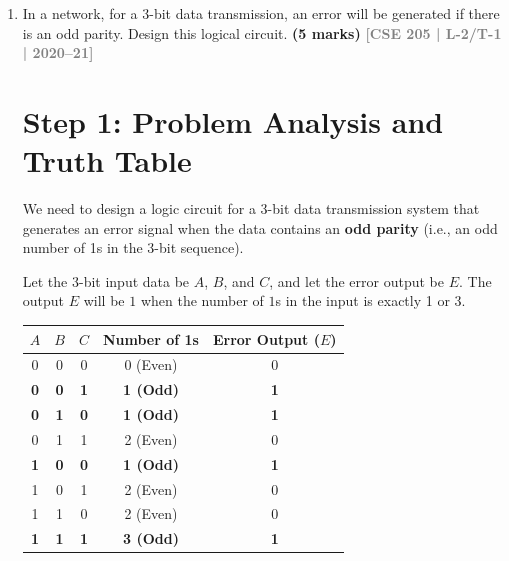 \documentclass[12pt,a3paper]{article}
\newcommand{\yr}[1]{\hfill\textcolor{gray}{\small\textbf{[#1]}}}
\newcommand{\mk}[1]{\textcolor{orange!70!black}{\small\textbf{(#1 marks)}}}
\begin{document}
\begin{enumerate}


\item In a network, for a 3-bit data transmission, an error will be generated if there is an odd parity. Design this logical circuit.
\mk{5} \yr{CSE 205 | L-2/T-1 | 2020--21}

\begin{tcolorbox}[enhanced,breakable,ansbox,colback=cA!4,colframe=cA,boxrule=0.8pt,arc=5pt,title={\textbf{Answer}},fonttitle=\bfseries\color{white},colbacktitle=cA]

\section*{Step 1: Problem Analysis and Truth Table}

We need to design a logic circuit for a 3-bit data transmission system that generates an error signal when the data contains an \textbf{odd parity} (i.e., an odd number of 1s in the 3-bit sequence). 

Let the 3-bit input data be $A$, $B$, and $C$, and let the error output be $E$. The output $E$ will be $1$ when the number of $1$s in the input is exactly 1 or 3.

\begin{center}
\renewcommand{\arraystretch}{1.2}
\begin{tabular}{ccc|c|c}
    \toprule
    \textbf{$A$} & \textbf{$B$} & \textbf{$C$} & \textbf{Number of 1s} & \textbf{Error Output ($E$)} \\
    \midrule
    0 & 0 & 0 & 0 (Even) & 0 \\
    \textcolor{cA}{\textbf{0}} & \textcolor{cA}{\textbf{0}} & \textcolor{cA}{\textbf{1}} & \textcolor{cA}{\textbf{1 (Odd)}}  & \textcolor{cA}{\textbf{1}} \\
    \textcolor{cA}{\textbf{0}} & \textcolor{cA}{\textbf{1}} & \textcolor{cA}{\textbf{0}} & \textcolor{cA}{\textbf{1 (Odd)}}  & \textcolor{cA}{\textbf{1}} \\
    0 & 1 & 1 & 2 (Even) & 0 \\
    \textcolor{cA}{\textbf{1}} & \textcolor{cA}{\textbf{0}} & \textcolor{cA}{\textbf{0}} & \textcolor{cA}{\textbf{1 (Odd)}}  & \textcolor{cA}{\textbf{1}} \\
    1 & 0 & 1 & 2 (Even) & 0 \\
    1 & 1 & 0 & 2 (Even) & 0 \\
    \textcolor{cA}{\textbf{1}} & \textcolor{cA}{\textbf{1}} & \textcolor{cA}{\textbf{1}} & \textcolor{cA}{\textbf{3 (Odd)}}  & \textcolor{cA}{\textbf{1}} \\
    \bottomrule
\end{tabular}
\end{center}


\end{tcolorbox}
\end{enumerate}
\end{document}
